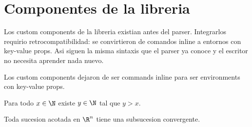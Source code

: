 \section{ Componentes de la libreria }

  Los custom components de la libreria existian antes del parser. Integrarlos
  requirio retrocompatibilidad: se convirtieron de comandos inline a entornos
  con key-value props. Asi siguen la misma sintaxis que el parser ya conoce y
  el escritor no necesita aprender nada nuevo.

  \begin{axiom}
    Los custom components dejaron de ser commands inline para ser environments con key-value props.
  \end{axiom}

  \begin{axiom}[title=Arquimedes, label=ax-arq]
    Para todo $x \in \N$ existe $y \in \N$ tal que $y > x$.
  \end{axiom}

  \begin{theorem}
    Toda sucesion acotada en $\R^n$ tiene una subsucesion convergente.
  \end{theorem}



